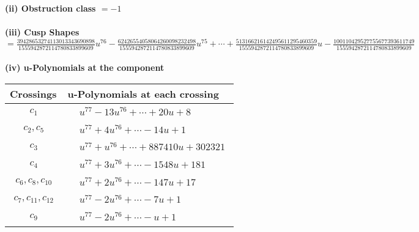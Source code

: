 \documentclass[1p]{elsarticle_modified}
\theoremstyle{definition}
\begin{document}
\flushleft \textbf{(ii) Obstruction class $= -1$}\\~\\
\flushleft \textbf{(iii) Cusp Shapes $= \frac{39428653274113013343690898}{1555942872114780833899609} u^{76}-\frac{62426554058064260098232498}{1555942872114780833899609} u^{75}+\cdots+\frac{513166216142495611295460359}{1555942872114780833899609} u-\frac{100110429527755677393611749}{1555942872114780833899609}$}\\~\\
\newpage\renewcommand{\arraystretch}{1}
\flushleft \textbf{(iv) u-Polynomials at the component}\newline \\
\begin{tabular}{m{50pt}|m{274pt}}
Crossings & \hspace{64pt}u-Polynomials at each crossing \\
\hline $$\begin{aligned}c_{1}\end{aligned}$$&$\begin{aligned}
&u^{77}-13 u^{76}+\cdots+20 u+8
\end{aligned}$\\
\hline $$\begin{aligned}c_{2},c_{5}\end{aligned}$$&$\begin{aligned}
&u^{77}+4 u^{76}+\cdots-14 u+1
\end{aligned}$\\
\hline $$\begin{aligned}c_{3}\end{aligned}$$&$\begin{aligned}
&u^{77}+u^{76}+\cdots+887410 u+302321
\end{aligned}$\\
\hline $$\begin{aligned}c_{4}\end{aligned}$$&$\begin{aligned}
&u^{77}+3 u^{76}+\cdots-1548 u+181
\end{aligned}$\\
\hline $$\begin{aligned}c_{6},c_{8},c_{10}\end{aligned}$$&$\begin{aligned}
&u^{77}+2 u^{76}+\cdots-147 u+17
\end{aligned}$\\
\hline $$\begin{aligned}c_{7},c_{11},c_{12}\end{aligned}$$&$\begin{aligned}
&u^{77}-2 u^{76}+\cdots-7 u+1
\end{aligned}$\\
\hline $$\begin{aligned}c_{9}\end{aligned}$$&$\begin{aligned}
&u^{77}-2 u^{76}+\cdots- u+1
\end{aligned}$\\
\hline
\end{tabular}\\~\\
\end{document}
